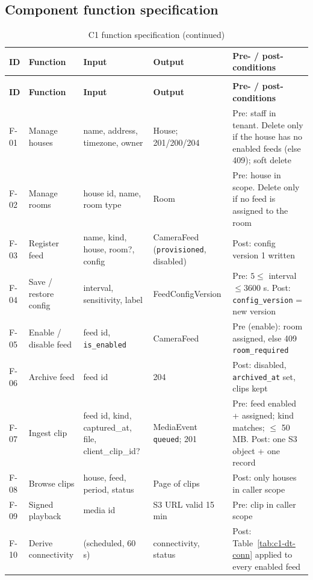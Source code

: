 \subsection{Component function specification}
\begin{longtable}{L{1.1cm}L{2.5cm}L{3.3cm}L{3.0cm}L{4.8cm}}
\caption{C1 function specification}\label{tab:c1-funcspec}\\
\toprule
\textbf{ID} & \textbf{Function} & \textbf{Input} & \textbf{Output} & \textbf{Pre- / post-conditions} \\
\midrule
\endfirsthead
\caption[]{C1 function specification (continued)}\\
\toprule
\textbf{ID} & \textbf{Function} & \textbf{Input} & \textbf{Output} & \textbf{Pre- / post-conditions} \\
\midrule
\endhead
F-01 & Manage houses & name, address, timezone, owner & House; 201/200/204 & Pre: staff in tenant. Delete only if the house has no enabled feeds (else 409); soft delete \\
F-02 & Manage rooms & house id, name, room type & Room & Pre: house in scope. Delete only if no feed is assigned to the room \\
F-03 & Register feed & name, kind, house, room?, config & CameraFeed (\texttt{provisioned}, disabled) & Post: config version 1 written \\
F-04 & Save / restore config & interval, sensitivity, label & FeedConfigVersion & Pre: $5 \le$ interval $\le 3600$ s. Post: \texttt{config\_version} = new version \\
F-05 & Enable / disable feed & feed id, \texttt{is\_enabled} & CameraFeed & Pre (enable): room assigned, else 409 \texttt{room\_required} \\
F-06 & Archive feed & feed id & 204 & Post: disabled, \texttt{archived\_at} set, clips kept \\
F-07 & Ingest clip & feed id, kind, captured\_at, file, client\_clip\_id? & MediaEvent \texttt{queued}; 201 & Pre: feed enabled + assigned; kind matches; $\le$ 50 MB. Post: one S3 object + one record \\
F-08 & Browse clips & house, feed, period, status & Page of clips & Post: only houses in caller scope \\
F-09 & Signed playback & media id & S3 URL valid 15 min & Pre: clip in caller scope \\
F-10 & Derive connectivity & (scheduled, 60 s) & connectivity, status & Post: Table~\ref{tab:c1-dt-conn} applied to every enabled feed \\
\bottomrule
\end{longtable}

